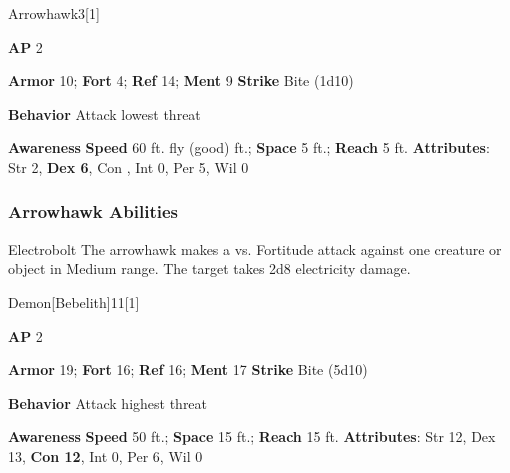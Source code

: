 \begin{monsection}{Arrowhawk}{3}[1]
\vspace{-1em}\vspace{-1em}
\begin{spellcontent}
\begin{spelltargetinginfo}
{\textbf{AP} 2}

\pari \textbf{Armor} 10;
\textbf{Fort} 4;
\textbf{Ref} 14;
\textbf{Ment} 9
\pari \textbf{Strike} Bite  (1d10)



\pari \textbf{Behavior} Attack lowest threat
\end{spelltargetinginfo}
\end{spellcontent}

\begin{monsterfooter}
\pari \textbf{Awareness} 
\pari \textbf{Speed} 60 ft. fly (good) ft.;
\textbf{Space} 5 ft.;
\textbf{Reach} 5 ft.
\pari \textbf{Attributes}:
Str 2,
\textbf{Dex 6},
Con ,
Int 0,
Per 5,
Wil 0
\end{monsterfooter}
\end{monsection}


\subsubsection{Arrowhawk Abilities}

\begin{ability}{Electrobolt}
The arrowhawk makes a  vs. Fortitude attack against one creature or object in Medium range.
\hit The target takes 2d8 electricity damage.
\end{ability}

\begin{monsection}{Demon}[Bebelith]{11}[1]
\vspace{-1em}\vspace{-1em}
\begin{spellcontent}
\begin{spelltargetinginfo}
{\textbf{AP} 2}

\pari \textbf{Armor} 19;
\textbf{Fort} 16;
\textbf{Ref} 16;
\textbf{Ment} 17
\pari \textbf{Strike} Bite  (5d10)



\pari \textbf{Behavior} Attack highest threat
\end{spelltargetinginfo}
\end{spellcontent}

\begin{monsterfooter}
\pari \textbf{Awareness} 
\pari \textbf{Speed} 50 ft.;
\textbf{Space} 15 ft.;
\textbf{Reach} 15 ft.
\pari \textbf{Attributes}:
Str 12,
Dex 13,
\textbf{Con 12},
Int 0,
Per 6,
Wil 0
\end{monsterfooter}
\end{monsection}


